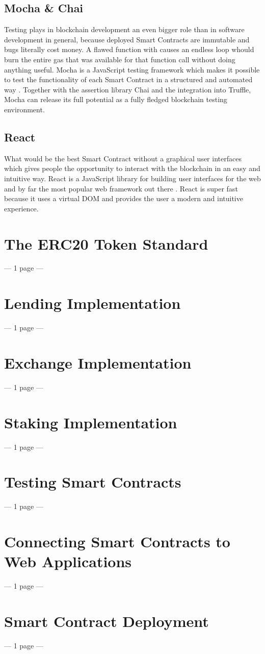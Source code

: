 \subsection{Mocha \& Chai}
Testing plays in blockchain development an even bigger role than in software development in general, because deployed Smart Contracts are immutable and bugs literally cost money. A flawed function with causes an endless loop whould burn the entire gas that was available for that function call without doing anything useful. Mocha is a JavaScript testing framework which makes it possible to test the functionality of each Smart Contract in a structured and automated way \cite{Mocha}. Together with the assertion library Chai \cite{Chai} and the integration into Truffle, Mocha can release its full potential as a fully fledged blockchain testing environment.

\subsection{React}
What would be the best Smart Contract without a graphical user interfaces which gives people the opportunity to interact with the blockchain in an easy and intuitive way. React is a JavaScript library for building user interfaces for the web and by far the most popular web framework out there \cite{React}. React is super fast because it uses a virtual DOM and provides the user a modern and intuitive experience.

\section{The ERC20 Token Standard}
--- 1 page ---

\section{Lending Implementation}
--- 1 page ---

\section{Exchange Implementation}
--- 1 page ---

\section{Staking Implementation}
--- 1 page ---

\section{Testing Smart Contracts}
--- 1 page ---

\section{Connecting Smart Contracts to Web Applications}
--- 1 page ---

\section{Smart Contract Deployment}
--- 1 page ---
